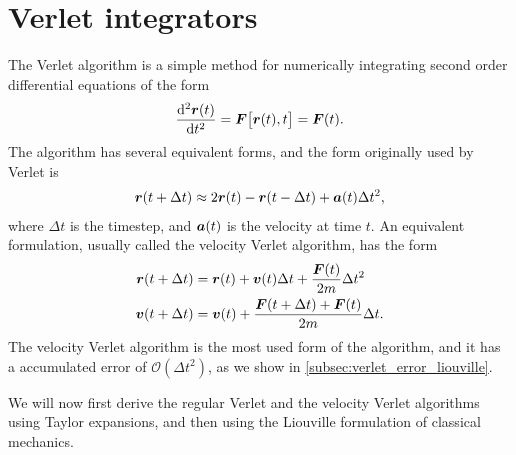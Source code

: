 \chapter{Verlet integrators\label{appendix:verlet_integrators}}
The Verlet algorithm\cite{verlet1967computer} is a simple method for numerically integrating second order differential equations of the form 
\begin{align*}
    \dod[2]{\rvec(t)}{t} = \Fvec\big[\rvec(t), t\big] = \Fvec(t).
\end{align*}
The algorithm has several equivalent forms, and the form originally used by Verlet is
\begin{align*}
    \boldsymbol{r}(t + \Delta t) \approx 2\boldsymbol{r}(t) - \boldsymbol{r}(t - \Delta t) + \boldsymbol{a}(t)\Delta t^2,
\end{align*}
where $\Delta t$ is the timestep, and $\boldsymbol{a}(t)$ is the velocity at time $t$. An equivalent formulation, usually called the velocity Verlet algorithm, has the form
\begin{align*}
    \boldsymbol{r}(t + \Delta t) &= \boldsymbol{r}(t) + \boldsymbol{v}(t)\Delta t + \frac{\boldsymbol{F}(t)}{2m}\Delta t^2 \\
    \boldsymbol{v}(t + \Delta t) &= \boldsymbol{v}(t) + \frac{\boldsymbol{F}(t + \Delta t) + \boldsymbol{F}(t)}{2m}\Delta t.
\end{align*}
The velocity Verlet algorithm is the most used form of the algorithm, and it has a accumulated error of $\mathcal{O}(\Delta t^2)$, as we show in \cref{subsec:verlet_error_liouville}. %

We will now first derive the regular Verlet and the velocity Verlet algorithms using Taylor expansions, and then using the Liouville formulation of classical mechanics.
